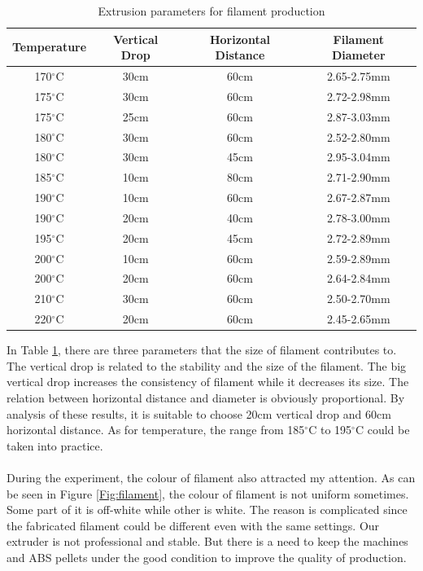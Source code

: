 \begin{table}[t]
\centering
\caption{Extrusion parameters for filament production}
\begin{tabular}{c c c c}
\hline
\textbf{Temperature} & \textbf{Vertical Drop} & \textbf{Horizontal Distance} & \textbf{Filament Diameter}\\
\hline
170$^{\circ}$C & 30cm & 60cm & 2.65-2.75mm \\
175$^{\circ}$C & 30cm & 60cm & 2.72-2.98mm \\
175$^{\circ}$C & 25cm & 60cm & 2.87-3.03mm \\
180$^{\circ}$C & 30cm & 60cm & 2.52-2.80mm \\
180$^{\circ}$C & 30cm & 45cm & 2.95-3.04mm \\
185$^{\circ}$C & 10cm & 80cm & 2.71-2.90mm \\
190$^{\circ}$C & 10cm & 60cm & 2.67-2.87mm \\
190$^{\circ}$C & 20cm & 40cm & 2.78-3.00mm \\
195$^{\circ}$C & 20cm & 45cm & 2.72-2.89mm \\
200$^{\circ}$C & 10cm & 60cm & 2.59-2.89mm \\
200$^{\circ}$C & 20cm & 60cm & 2.64-2.84mm \\
210$^{\circ}$C & 30cm & 60cm & 2.50-2.70mm \\
220$^{\circ}$C & 20cm & 60cm & 2.45-2.65mm \\
\hline
\end{tabular}
\label{tab:tems}
\end{table}
In Table \ref{tab:tems}, there are three parameters that the size of filament contributes to. The vertical drop is related to the stability and the size of the filament. The big vertical drop increases the consistency of filament while it decreases its size. The relation between horizontal distance and diameter is obviously proportional. By analysis of these results, it is suitable to choose 20cm vertical drop and 60cm horizontal distance.  As for temperature, the range from 185$^{\circ}$C to 195$^{\circ}$C could be taken into practice.\\
\\
During the experiment, the colour of filament also attracted my attention. As can be seen in Figure \ref{Fig:filament}, the colour of filament is not uniform sometimes. Some part of it is off-white while other is white. The reason is complicated since the fabricated filament could be different even with the same settings. Our extruder is not professional and stable. But there is a need to keep the machines and ABS pellets under the good condition to improve the quality of production. 

